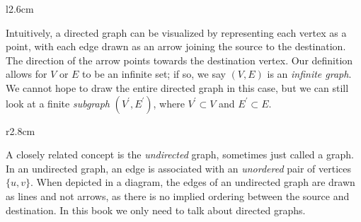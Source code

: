\documentclass[../generics]{subfiles}
\begin{document}
\begin{wrapfigure}{l}{2.6cm}
\end{wrapfigure}
\noindent
Intuitively, a directed graph can be visualized by representing each vertex as a point, with each edge drawn as an arrow joining the source to the destination. The direction of the arrow points towards the destination vertex. Our definition allows for $V$ or $E$ to be an infinite set; if so, we say $(V, E)$ is an \emph{infinite graph}. We cannot hope to draw the entire directed graph in this case, but we can still look at a finite \emph{subgraph} $(V^\prime, E^\prime)$, where $V^\prime\subset V$ and $E^\prime\subset E$.


\begin{wrapfigure}{r}{2.8cm}
\end{wrapfigure}
A closely related concept is the \emph{undirected} graph, sometimes just called a graph. In an undirected graph, an edge is associated with an \emph{unordered} pair of vertices $\{u,v\}$. When depicted in a diagram, the edges of an undirected graph are drawn as lines and not arrows, as there is no implied ordering between the source and destination. In this book we only need to talk about directed graphs.
\end{document}
